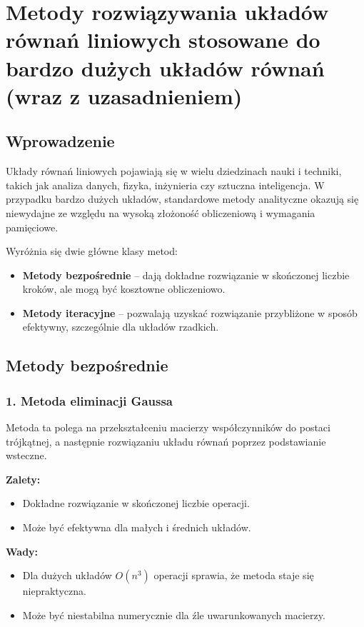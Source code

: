 \section{Metody rozwiązywania układów równań liniowych stosowane do bardzo dużych układów równań (wraz z uzasadnieniem)}

\subsection{Wprowadzenie}
Układy równań liniowych pojawiają się w wielu dziedzinach nauki i techniki, takich jak analiza danych, fizyka, inżynieria czy sztuczna inteligencja. W przypadku bardzo dużych układów, standardowe metody analityczne okazują się niewydajne ze względu na wysoką złożoność obliczeniową i wymagania pamięciowe.

Wyróżnia się dwie główne klasy metod:
\begin{itemize}
    \item \textbf{Metody bezpośrednie} – dają dokładne rozwiązanie w skończonej liczbie kroków, ale mogą być kosztowne obliczeniowo.
    \item \textbf{Metody iteracyjne} – pozwalają uzyskać rozwiązanie przybliżone w sposób efektywny, szczególnie dla układów rzadkich.
\end{itemize}

\subsection{Metody bezpośrednie}

\subsubsection{1. Metoda eliminacji Gaussa}
Metoda ta polega na przekształceniu macierzy współczynników do postaci trójkątnej, a następnie rozwiązaniu układu równań poprzez podstawianie wsteczne.

\textbf{Zalety:}
\begin{itemize}
    \item Dokładne rozwiązanie w skończonej liczbie operacji.
    \item Może być efektywna dla małych i średnich układów.
\end{itemize}

\textbf{Wady:}
\begin{itemize}
    \item Dla dużych układów \( O(n^3) \) operacji sprawia, że metoda staje się niepraktyczna.
    \item Może być niestabilna numerycznie dla źle uwarunkowanych macierzy.
\end{itemize}

